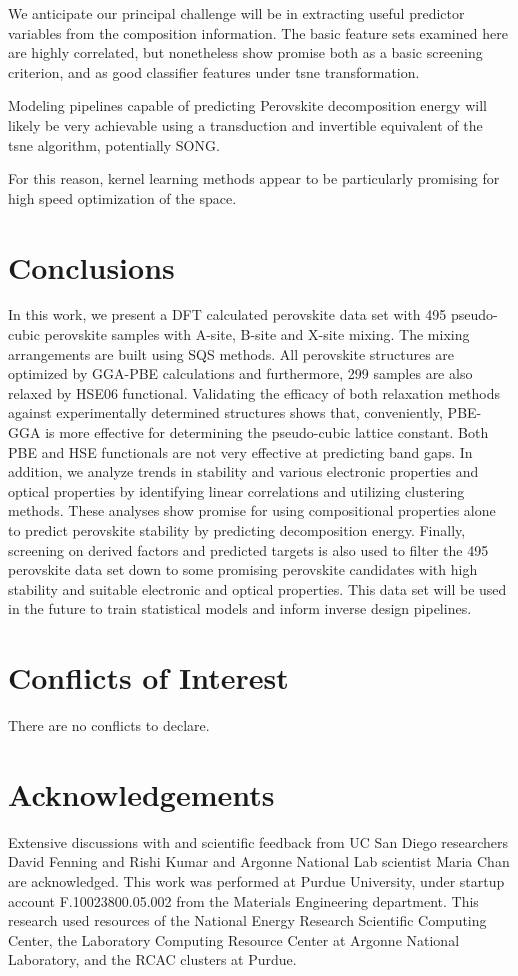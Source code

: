\documentclass[twoside, twocolumn, 9pt, draft]{article}
\begin{document}
We anticipate our principal challenge will be in extracting useful
predictor variables from the composition information. The basic
feature sets examined here are highly correlated, but nonetheless show
promise both as a basic screening criterion, and as good classifier
features under \gls{tsne} transformation.

Modeling pipelines capable of predicting Perovskite decomposition
energy will likely be very achievable using a transduction and
invertible equivalent of the \gls{tsne} algorithm,
potentially SONG.

For this reason, kernel learning methods appear to be particularly
promising for high speed optimization of the space.

\section*{Conclusions}
\label{sec:org2e4c684}
In this work, we present a DFT calculated perovskite data set with 495
pseudo-cubic perovskite samples with A-site, B-site and X-site
mixing. The mixing arrangements are built using SQS methods. All
perovskite structures are optimized by GGA-PBE calculations and
furthermore, 299 samples are also relaxed by HSE06
functional. Validating the efficacy of both relaxation methods against
experimentally determined structures shows that, conveniently, PBE-GGA
is more effective for determining the pseudo-cubic lattice
constant. Both PBE and HSE functionals are not very effective at
predicting band gaps. In addition, we analyze trends in stability and
various electronic properties and optical properties by identifying
linear correlations and utilizing clustering methods. These analyses
show promise for using compositional properties alone to predict
perovskite stability by predicting decomposition energy. Finally,
screening on derived factors and predicted targets is also used to
filter the 495 perovskite data set down to some promising perovskite
candidates with high stability and suitable electronic and optical
properties. This data set will be used in the future to train
statistical models and inform inverse design pipelines.

\section*{Conflicts of Interest}
\label{sec:orgd744f29}
There are no conflicts to declare.

\section*{Acknowledgements}
\label{sec:org4e68e1f}
Extensive discussions with and scientific feedback from UC San Diego
researchers David Fenning and Rishi Kumar and Argonne National Lab
scientist Maria Chan are acknowledged. This work was performed at
Purdue University, under startup account F.10023800.05.002 from the
Materials Engineering department. This research used resources of the
National Energy Research Scientific Computing Center, the Laboratory
Computing Resource Center at Argonne National Laboratory, and the RCAC
clusters at Purdue.
\end{document}
